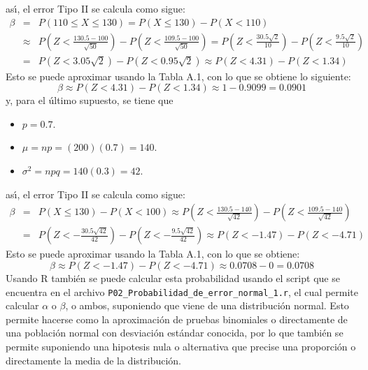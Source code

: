 \begin{solucion}
\begin{itemize}
 \end{itemize}
 as\'{\i}, el error Tipo II se calcula como sigue:
 \begin{eqnarray*}
  \beta & = & P(110 \leq X \leq 130) = P(X \leq 130) - P(X < 110) \\
  & \approx & P\left( Z < \frac{130.5-100}{\sqrt{50}} \right) - P\left( Z < \frac{109.5-100}{\sqrt{50}} \right) = P\left( Z < \frac{30.5\sqrt{2}}{10} \right) - P\left( Z < \frac{9.5\sqrt{2}}{10} \right) \\
  & = & P\left(Z < 3.05\sqrt{2}\right) - P\left(Z < 0.95\sqrt{2}\right) \approx P(Z < 4.31) - P(Z < 1.34)
 \end{eqnarray*}
 Esto se puede aproximar usando la Tabla A.1, con lo que se obtiene lo siguiente:
 \begin{equation*}
  \beta \approx P(Z < 4.31) - P(Z < 1.34) \approx 1 - 0.9099 = 0.0901
 \end{equation*}
 y, para el \'ultimo supuesto, se tiene que
 \begin{itemize}
  \item $p = 0.7$.
  \item $\mu = np = (200)(0.7) = 140$.
  \item $\sigma^2 = npq = 140(0.3) = 42$.
 \end{itemize}
 as\'{\i}, el error Tipo II se calcula como sigue:
 \begin{eqnarray*}
  \beta & = & P(X \leq 130) - P(X < 100) \approx P\left( Z < \frac{130.5-140}{\sqrt{42}} \right) - P\left( Z < \frac{109.5-140}{\sqrt{42}} \right) \\
  & = & P\left( Z < -\frac{30.5\sqrt{42}}{42} \right) - P\left( Z < -\frac{9.5\sqrt{42}}{42} \right) \approx P(Z < -1.47) - P(Z < -4.71)
 \end{eqnarray*}
 Esto se puede aproximar usando la Tabla A.1, con lo que se obtiene:
 \begin{equation*}
  \beta \approx P(Z < -1.47) - P(Z < -4.71) \approx 0.0708-0 = 0.0708
 \end{equation*}
 Usando R tambi\'en se puede calcular esta probabilidad usando el script que se encuentra en el archivo \texttt{P02\_Probabilidad\_de\_error\_normal\_1.r}, el cual permite calcular $\alpha$ o $\beta$, o ambos, suponiendo que viene de una distribuci\'on normal. Esto permite hacerse como la aproximaci\'on de pruebas binomiales o directamente de una poblaci\'on normal con desviaci\'on est\'andar conocida, por lo que tambi\'en se permite suponiendo una hipotesis nula o alternativa que precise una proporci\'on o directamente la media de la distribuci\'on.

\end{solucion}
